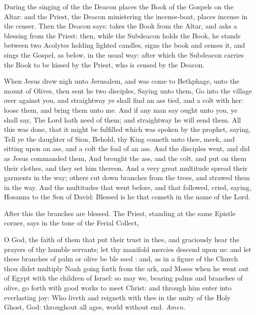 \begin{rubric}
    During the singing of the  the Deacon places the Book of the Gospels on the Altar: and the Priest, the Deacon ministering the incense-boat, places incense in the censer. Then the Deacon says:  takes the Book from the Altar, and asks a blessing from the Priest: then, while the Subdeacon holds the Book, he stands between two Acolytes holding lighted candles, signs the book and censes it, and sings the Gospel, as below, in the usual way: after which the Subdeacon carries the Book to be kissed by the Priest, who is censed by the Deacon.
\end{rubric}

\vspace{-0.5\baselineskip}


\vspace{-0.25\baselineskip}

 When Jesus drew nigh unto Jerusalem, and was come to Bethphage, unto the mount of Olives, then sent he two disciples, Saying unto them, Go into the village over against you, and straightway ye shall find an ass tied, and a colt with her: loose them, and bring them unto me. And if any man say ought unto you, ye shall say, The Lord hath need of them; and straightway he will send them. All this was done, that it might be fulfilled which was spoken by the prophet, saying, Tell ye the daughter of Sion, Behold, thy King cometh unto thee, meek, and sitting upon an ass, and a colt the foal of an ass. And the disciples went, and did as Jesus commanded them, And brought the ass, and the colt, and put on them their clothes, and they set him thereon. And a very great multitude spread their garments in the way; others cut down branches from the trees, and strawed them in the way. And the multitudes that went before, and that followed, cried, saying, Hosanna to the Son of David: Blessed is he that cometh in the name of the Lord.

\begin{rubric}
    After this the branches are blessed. The Priest, standing at the same Epistle corner, says in the tone of the Ferial Collect,
\end{rubric}

{} O God, the faith of them that put their trust in thee, and graciously hear the prayers of thy humble servants; let thy manifold mercies descend upon us: and let these branches of palm or olive be ble {} ssed : and, as in a figure of the Church thou didst multiply Noah going forth from the ark, and Moses when he went out of Egypt with the children of Israel: so may we, bearing palms and branches of olive, go forth with good works to meet Christ: and through him enter into everlasting joy: Who liveth and reigneth with thee in the unity of the Holy Ghost, God: throughout all ages, world without end. \textit{Amen.}\\

